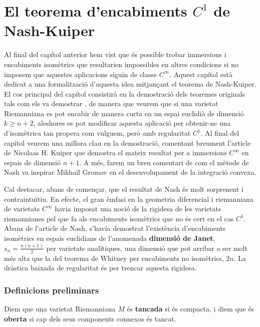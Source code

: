 \chapter{El teorema d'encabiments $C^1$ de Nash-Kuiper}\label{chap:capitol_nash}

Al final del capítol anterior hem vist que és possible trobar immersions i encabiments isomètrics que resultarien impossibles en altres condicions si no imposem que aquestes aplicacions siguin de classe $C^\infty$. Aquest capítol està dedicat a una formalització d'aquesta idea mitjançant el teorema de Nash-Kuiper. El cos principal del capítol consistirà en la demostració dels teoremes originals tals com els va demostrar \citet{nash1954}, de manera que veurem que si una varietat Riemanniana es pot encabir de manera curta en un espai euclidià de dimensió $k\ge n+2$, aleshores es pot modificar aquesta aplicació per obtenir-ne una d'isomètrica tan propera com vulguem, però amb regularitat $C^1$. Al final del capítol veurem una millora clau en la demostració, comentant breument l'article de Nicolaas H. Kuiper \cite{kuiper1955} que demostra el mateix resultat per a immersions $C^\infty$ en espais de dimensió $n+1$. A més, farem un breu comentari de com el mètode de Nash va inspirar Mikhaïl Gromov en el desenvolupament de la integració convexa. 

Cal destacar, abans de començar, que el resultat de Nash és molt sorprenent i contraintuïtiu. En efecte, el gran èmfasi en la geometria diferencial i riemanniana de varietats $C^\infty$ havia imposat una noció de la rigidesa de les varietats riemannianes pel que fa als encabiments isomètrics que no és cert en el cas $C^1$. Abans de l'article de Nash, s'havia demostrat l'existència d'encabiments isomètrics en espais euclidians de l'anomenada \textbf{dimensió de Janet}, $s_n = \frac{n(n+1)}{2}$ per varietats analítiques, una dimensió que pot arribar a ser molt més alta que la del teorema de Whitney per encabiments no isomètrics, $2n$. La dràstica baixada de regularitat és  per trencar aquesta rigidesa.
\\

\subsection{Definicions preliminars}
\begin{defi}
    Diem que una varietat Riemanniana $M$ és \textbf{tancada} si és compacta, i diem que és \textbf{oberta} si cap dels seus components connexos és tancat.
\end{defi}

